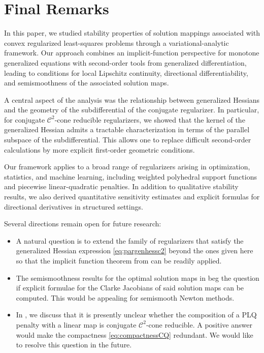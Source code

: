 \documentclass[reqno]{amsart}
\numberwithin{equation}{section}
\begin{document}




\section{Final Remarks}\label{sec:Final} 
In this paper, we studied stability properties of solution mappings associated with convex regularized least-squares problems through a variational-analytic framework.  Our approach combines an implicit-function perspective for monotone generalized equations with second-order tools from generalized differentiation, leading to conditions for local Lipschitz continuity, directional differentiability, and semismoothness of the associated solution maps.

A central aspect of the analysis was the relationship between generalized Hessians and the geometry of the subdifferential of the conjugate regularizer. In particular, for conjugate \(\mathcal{C}^2\)-cone reducible regularizers, we showed that the kernel of the generalized Hessian admits a tractable characterization in terms of the parallel subspace of the subdifferential. This allows one to replace difficult second-order calculations by more explicit first-order geometric conditions.

Our framework applies to a broad range of regularizers arising in optimization, statistics, and machine learning, including weighted polyhedral support functions and piecewise linear-quadratic penalties. In addition to qualitative stability results, we also derived quantitative sensitivity estimates and explicit formulas for directional derivatives in structured settings.

Several directions remain open for future research: 
\begin{itemize}
\item[i)] A natural question is to extend the family of regularizers that satisfy the generalized Hessian  expression \eqref{eq:pargenhessc2} beyond the ones given here so that the implicit function theorem from 
 can be readily applied.
 \item[ii)] The semismoothness results for the optimal solution maps in  beg the question if explicit formulae for the Clarke Jacobians of said solution maps can be computed. This would be appealing for semismooth Newton methods. 

 \item[iii)] In , we discuss that it is presently unclear whether the composition of a PLQ penalty with a linear map is  conjugate  $\mathcal{C}^2$-cone reducible. A positive answer would make the compactness \eqref{eq:compactnessCQ} redundant. 
 We would like to resolve this question in the future.  
 
\end{itemize}
\end{document}
